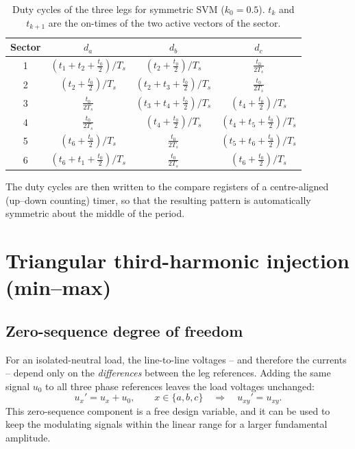 \documentclass[11pt,a4paper]{article}
\newcommand{\Ts}{T_{s}}
\begin{document}
\begin{table}[h]
\centering
\renewcommand{\arraystretch}{1.35}
\begin{tabular}{cccc}
\toprule
Sector & $d_a$ & $d_b$ & $d_c$ \\
\midrule
1 & $(t_1+t_2+\tfrac{t_0}{2})/\Ts$ & $(t_2+\tfrac{t_0}{2})/\Ts$ & $\tfrac{t_0}{2\Ts}$ \\
2 & $(t_2+\tfrac{t_0}{2})/\Ts$ & $(t_2+t_3+\tfrac{t_0}{2})/\Ts$ & $\tfrac{t_0}{2\Ts}$ \\
3 & $\tfrac{t_0}{2\Ts}$ & $(t_3+t_4+\tfrac{t_0}{2})/\Ts$ & $(t_4+\tfrac{t_0}{2})/\Ts$ \\
4 & $\tfrac{t_0}{2\Ts}$ & $(t_4+\tfrac{t_0}{2})/\Ts$ & $(t_4+t_5+\tfrac{t_0}{2})/\Ts$ \\
5 & $(t_6+\tfrac{t_0}{2})/\Ts$ & $\tfrac{t_0}{2\Ts}$ & $(t_5+t_6+\tfrac{t_0}{2})/\Ts$ \\
6 & $(t_6+t_1+\tfrac{t_0}{2})/\Ts$ & $\tfrac{t_0}{2\Ts}$ & $(t_6+\tfrac{t_0}{2})/\Ts$ \\
\bottomrule
\end{tabular}
\caption{Duty cycles of the three legs for symmetric SVM ($k_0 = 0.5$).
$t_k$ and $t_{k+1}$ are the on-times of the two active vectors of the sector.}
\label{tab:duty}
\end{table}

The duty cycles are then written to the compare registers of a centre-aligned
(up--down counting) timer, so that the resulting pattern is automatically symmetric
about the middle of the period.

\section{Triangular third-harmonic injection (min--max)}
\label{sec:minmax}

\subsection{Zero-sequence degree of freedom}

For an isolated-neutral load, the line-to-line voltages -- and therefore the currents
-- depend only on the \emph{differences} between the leg references. Adding the same
signal $u_0$ to all three phase references leaves the load voltages unchanged:
\begin{equation}
u_x' = u_x + u_0, \qquad x \in \{a,b,c\} \quad\Longrightarrow\quad
u_{xy}' = u_{xy}.
\end{equation}
This zero-sequence component is a free design variable, and it can be used to keep
the modulating signals within the linear range for a larger fundamental amplitude.
\end{document}
